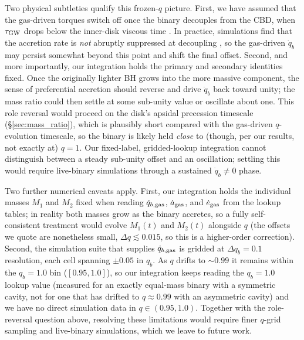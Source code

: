 \documentclass[fleqn,usenatbib]{mnras}
\begin{document}
Two physical subtleties qualify this frozen-$q$ picture. First, we have assumed that the gas-driven torques switch off once the binary decouples from the CBD, when $\tau_{\rm GW}$ drops below the inner-disk viscous time \citep{Milos+2005-decouple, farris_2015, dittmann_decouple, krauth2023b}. In practice, simulations find that the accretion rate is \textit{not} abruptly suppressed at decoupling \citep{farris_2015}, so the gas-driven $\dot{q}_b$ may persist somewhat beyond this point and shift the final offset. Second, and more importantly, our integration holds the primary and secondary identities fixed. Once the originally lighter BH grows into the more massive component, the sense of preferential accretion should reverse and drive $\dot{q}_b$ back toward unity; the mass ratio could then settle at some sub-unity value or oscillate about one. This role reversal would proceed on the disk's apsidal precession timescale (\S\ref{sec:mass_ratio}), which is plausibly short compared with the gas-driven $q$-evolution timescale, so the binary is likely held \textit{close} to (though, per our results, not exactly at) $q = 1$. Our fixed-label, gridded-lookup integration cannot distinguish between a steady sub-unity offset and an oscillation; settling this would require live-binary simulations through a sustained $\dot{q}_b \neq 0$ phase.

Two further numerical caveats apply. First, our integration holds the individual masses $M_1$ and $M_2$ fixed when reading $\dot{q}_{b,\rm gas}$, $\dot{a}_{\rm gas}$, and $\dot{e}_{\rm gas}$ from the lookup tables; in reality both masses grow as the binary accretes, so a fully self-consistent treatment would evolve $M_1(t)$ and $M_2(t)$ alongside $q$ (the offsets we quote are nonetheless small, $\Delta q \lesssim 0.015$, so this is a higher-order correction). Second, the simulation suite that supplies $\dot{q}_{b,\rm gas}$ is gridded at $\Delta q_b = 0.1$ resolution, each cell spanning $\pm 0.05$ in $q_b$. As $q$ drifts to ${\sim}0.99$ it remains within the $q_b = 1.0$ bin ($[0.95, 1.0]$), so our integration keeps reading the $q_b = 1.0$ lookup value (measured for an exactly equal-mass binary with a symmetric cavity, not for one that has drifted to $q \approx 0.99$ with an asymmetric cavity) and we have no direct simulation data in $q \in (0.95, 1.0)$. Together with the role-reversal question above, resolving these limitations would require finer $q$-grid sampling and live-binary simulations, which we leave to future work.
\end{document}
